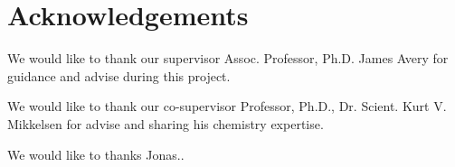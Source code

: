 \chapter*{Acknowledgements}
\label{chap:acknowl}

We would like to thank our supervisor Assoc. Professor,  Ph.D. James Avery for guidance and advise during this project.

We would like to thank our co-supervisor Professor,  Ph.D.,  Dr.  Scient. Kurt V. Mikkelsen for advise and sharing his chemistry expertise.

We would like to thanks Jonas..
